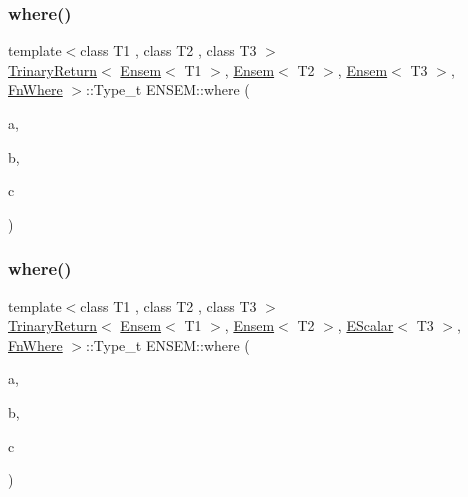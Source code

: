 \subsubsection{\texorpdfstring{where()}{where()}\hspace{0.1cm}{\footnotesize\ttfamily [1/7]}}
{\footnotesize\ttfamily template$<$class T1 , class T2 , class T3 $>$ \\
\mbox{\hyperlink{structENSEM_1_1TrinaryReturn}{Trinary\+Return}}$<$ \mbox{\hyperlink{classENSEM_1_1Ensem}{Ensem}}$<$ T1 $>$, \mbox{\hyperlink{classENSEM_1_1Ensem}{Ensem}}$<$ T2 $>$, \mbox{\hyperlink{classENSEM_1_1Ensem}{Ensem}}$<$ T3 $>$, \mbox{\hyperlink{structENSEM_1_1FnWhere}{Fn\+Where}} $>$\+::Type\+\_\+t E\+N\+S\+E\+M\+::where (\begin{DoxyParamCaption}\item[{const \mbox{\hyperlink{classENSEM_1_1Ensem}{Ensem}}$<$ T1 $>$ \&}]{a,  }\item[{const \mbox{\hyperlink{classENSEM_1_1Ensem}{Ensem}}$<$ T2 $>$ \&}]{b,  }\item[{const \mbox{\hyperlink{classENSEM_1_1Ensem}{Ensem}}$<$ T3 $>$ \&}]{c }\end{DoxyParamCaption})\hspace{0.3cm}{\ttfamily [inline]}}

\mbox{\label{group__eensem_ga954917c149f91e175980e8359b2e02a2}} 
\subsubsection{\texorpdfstring{where()}{where()}\hspace{0.1cm}{\footnotesize\ttfamily [2/7]}}
{\footnotesize\ttfamily template$<$class T1 , class T2 , class T3 $>$ \\
\mbox{\hyperlink{structENSEM_1_1TrinaryReturn}{Trinary\+Return}}$<$ \mbox{\hyperlink{classENSEM_1_1Ensem}{Ensem}}$<$ T1 $>$, \mbox{\hyperlink{classENSEM_1_1Ensem}{Ensem}}$<$ T2 $>$, \mbox{\hyperlink{classENSEM_1_1EScalar}{E\+Scalar}}$<$ T3 $>$, \mbox{\hyperlink{structENSEM_1_1FnWhere}{Fn\+Where}} $>$\+::Type\+\_\+t E\+N\+S\+E\+M\+::where (\begin{DoxyParamCaption}\item[{const \mbox{\hyperlink{classENSEM_1_1Ensem}{Ensem}}$<$ T1 $>$ \&}]{a,  }\item[{const \mbox{\hyperlink{classENSEM_1_1Ensem}{Ensem}}$<$ T2 $>$ \&}]{b,  }\item[{const \mbox{\hyperlink{classENSEM_1_1EScalar}{E\+Scalar}}$<$ T3 $>$ \&}]{c }\end{DoxyParamCaption})\hspace{0.3cm}{\ttfamily [inline]}}

